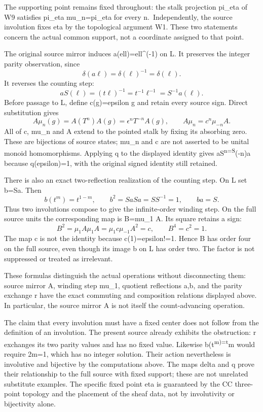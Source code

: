 \documentclass[
  11pt,
]{article}
\begin{document}
The supporting point remains fixed throughout: the stalk projection
pi\_eta of W9 satisfies pi\_eta mu\_n=pi\_eta for every
n.~Independently, the source involution fixes eta by the topological
argument W1. These two statements concern the actual common support, not
a coordinate assigned to that point.

The original source mirror induces a(ell)=ell\^{}(-1) on L. It preserves
the integer parity observation, since \[
\delta(a\ell)=\delta(\ell)^{-1}=\delta(\ell).
\] It reverses the counting step: \[
aS(\ell)=(t\ell)^{-1}=t^{-1}\ell^{-1}=S^{-1}a(\ell).
\] Before passage to L, define c(g)=epsilon g and retain every source
sign. Direct substitution gives \[
A\mu_n(g)=A(T^n)A(g)=\epsilon^nT^{-n}A(g),
\qquad A\mu_n=c^n\mu_{-n}A.
\] All of c, mu\_n and A extend to the pointed stalk by fixing its
absorbing zero. These are bijections of source states; mu\_n and c are
not asserted to be unital monoid homomorphisms. Applying q to the
displayed identity gives aS\textsuperscript{n=S}(-n)a because
q(epsilon)=1, with the original signed identity still retained.

There is also an exact two-reflection realization of the counting step.
On L set b=Sa. Then \[
b(t^m)=t^{1-m},\qquad b^2=SaSa=SS^{-1}=1,\qquad ba=S.
\] Thus two involutions compose to give the infinite-order winding step.
On the full source units the corresponding map is B=mu\_1 A. Its square
retains a sign: \[
B^2=\mu_1 A\mu_1 A=\mu_1c\mu_{-1}A^2=c,
\qquad B^4=c^2=1.
\] The map c is not the identity because c(1)=epsilon!=1. Hence B has
order four on the full source, even though its image b on L has order
two. The factor is not suppressed or treated as irrelevant.

These formulas distinguish the actual operations without disconnecting
them: source mirror A, winding step mu\_1, quotient reflections a,b, and
the parity exchange r have the exact commuting and composition relations
displayed above. In particular, the source mirror A is not itself the
count-advancing operation.

The claim that every involution must have a fixed center does not follow
from the definition of an involution. The present source already
exhibits the obstruction: r exchanges its two parity values and has no
fixed value. Likewise b(t\textsuperscript{m)=t}m would require 2m=1,
which has no integer solution. Their action nevertheless is involutive
and bijective by the computations above. The maps delta and q prove
their relationship to the full source with fixed support; these are not
unrelated substitute examples. The specific fixed point eta is
guaranteed by the CC three-point topology and the placement of the sheaf
data, not by involutivity or bijectivity alone.
\end{document}
